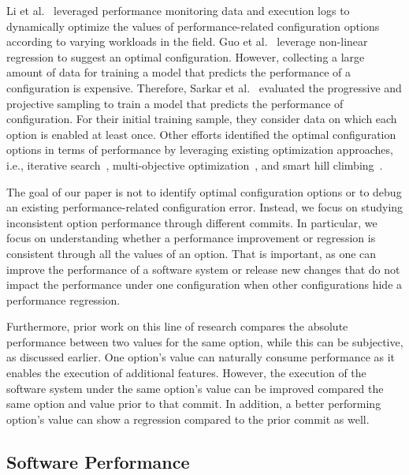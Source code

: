 Li et al.~\cite{LiAutoConfig} leveraged performance monitoring data and execution logs to dynamically optimize the values of performance-related configuration options according to varying workloads in the field. Guo et al.~\cite{RN3544} leverage non-linear regression to suggest an optimal configuration. However, collecting a large amount of data for training a model that predicts the performance of a configuration is expensive. Therefore, Sarkar et al.~\cite{RN3089} evaluated the progressive and projective sampling to train a model that predicts the performance of configuration. For their initial training sample, they consider data on which each option is enabled at least once. Other efforts identified the optimal configuration options in terms of performance by leveraging existing optimization approaches, i.e., iterative search~\cite{RN3545}, multi-objective optimization~\cite{singh2016optimizing}, and smart hill climbing~\cite{RN3518}.


The goal of our paper is not to identify optimal configuration options or to debug an existing performance-related configuration error. Instead, we focus on studying inconsistent option performance through different commits. In particular, we focus on understanding whether a performance improvement or regression is consistent through all the values of an option. That is important, as one can improve the performance of a software system or release new changes that do not impact the performance under one configuration when other configurations hide a performance regression. 

Furthermore, prior work on this line of research compares the absolute performance between two values for the same option, while this can be subjective, as discussed earlier. One option's value can naturally consume performance as it enables the execution of additional features. However, the execution of the software system under the same option's value can be improved  compared the same option and value prior to that commit. In addition, a better performing option's value can show a regression compared to the prior commit as well. %

\subsection{Software Performance}

